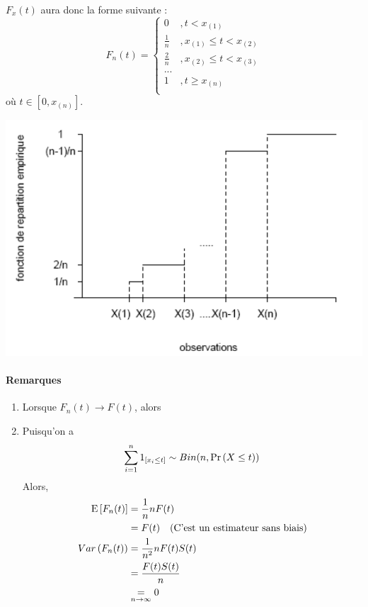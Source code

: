 \documentclass[12pt, french]{report}
\begin{document}
$F_x(t)$ aura donc la forme suivante : 
\begin{equation}
F_n(t) =
\begin{cases}
0				& , t < x_{(1)} \\
\frac{1}{n}		& , x_{(1)} \leq t < x_{(2)} \\
\frac{2}{n}		& , x_{(2)} \leq t < x_{(3)} \\
...				& \\
1				& , t \geq x_{(n)} \\
\end{cases}
\end{equation}
où $t \in [0, x_{(n)}]$.

\begin{center}
\includegraphics[scale=0.3]{Figures/Fct_de_repartition_empirique}
\end{center}


\paragraph{Remarques}
\begin{enumerate}[label=(\arabic*)]
\item Lorsque $F_n(t) \to F(t)$, alors

\item Puisqu'on a
\begin{align*}
\sum_{i=1}^{n} 1_{[x_i \leq t]} \sim Bin(n,\Pr \left( X \leq t \right))
\end{align*}
Alors,
\begin{align*}
\mathrm{E} \left[ F_n(t) \right]		& = \frac{1}{n} n F(t) \\
	& = F(t) \quad \text{(C'est un estimateur sans biais)} \\
Var \left( F_n(t) \right) & = \frac{1}{n^2}  n F(t) S(t) \\
	& = \frac{F(t) S(t)}{n}	\\
	& \underset{n \to \infty}{=} 0 \\
\end{align*}
\end{enumerate}
\end{document}

